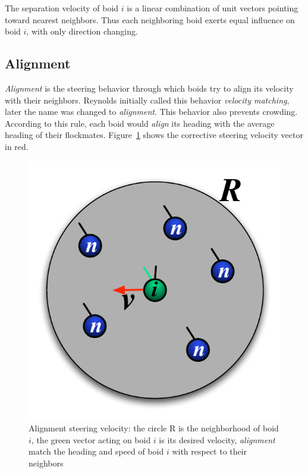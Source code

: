 The separation velocity of boid $i$ is a linear combination of unit vectors pointing toward nearest neighbors. Thus each neighboring boid exerts equal influence on boid $i$, with only direction changing. 

\subsection{Alignment}
\textit{Alignment} is the steering behavior through which boids try to align its velocity with their neighbors. Reynolds initially called this behavior \textit{velocity matching}, later the name was changed to \textit{alignment}. This behavior also prevents crowding. According to this rule, each boid would \textit{align} its heading with the average heading of their flockmates. Figure~\ref{alignmentPDF} shows the corrective steering velocity vector in red.

\begin{figure}[htbp]
\begin{center}
\includegraphics[scale=0.85]{figures/alignment.pdf}
\caption{Alignment steering velocity: the circle R is the neighborhood of boid $i$, the green vector acting on boid $i$ is its desired velocity, \textit{alignment} match the heading and speed of boid $i$ with respect to their neighbors}
\label{alignmentPDF}
\end{center}
\end{figure}

